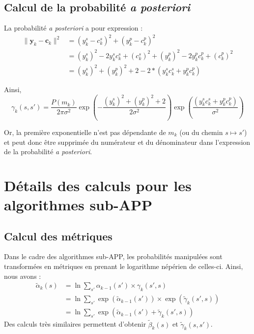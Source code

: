 \subsection{Calcul de la probabilité \textit{a posteriori}}
La probabilité \textit{a posteriori} a pour expression : 
\begin{align*}
	\|\mathbf{y}_k-\mathbf{c}_k\|^2 & = (y_k^s - c_k^s)^2 + (y_k^p - c_k^p)^2                                               \\
	                                & = (y_k^s)^2 - 2  y_k^s   c_k^s +  (c_k^s)^2 + (y_k^p)^2 - 2  y_k^p c_k^p +  (c_k^p)^2 \\
	                                & = (y_k^s)^2 +   (y_k^p)^2 + 2  - 2*( y_k^s   c_k^s +  y_k^p c_k^p)                    
\end{align*}

Ainsi, \[\gamma_k(s,s') = \frac{P(m_k)}{2\pi\sigma^2}\exp\left(-\frac{ (y_k^s)^2 +   (y_k^p)^2 + 2}{2\sigma^2}\right) \exp\left(\frac{( y_k^s   c_k^s +  y_k^p c_k^p)}{\sigma^2}\right)\]

Or, la première exponentielle n'est pas dépendante de $m_k$ (ou du chemin $ s \mapsto s'$) et peut donc être supprimée du numérateur et du dénominateur dans l’expression de la probabilité \textit{a posteriori}.


\section{Détails des calculs pour les algorithmes sub-APP}\label{append:subAPP}
\subsection{Calcul des métriques}
Dans le cadre des algorithmes sub-APP, les probabilités manipulées sont transformées en métriques en prenant le logarithme népérien de celles-ci. Ainsi, nous avons :
\begin{align*}
	\tilde{\alpha}_k(s) & = \ln \sum\limits_{s'}\alpha_{k-1}(s')\times\gamma_k(s',s)                                                     \\
	                    & = \ln \sum\limits_{s'} \exp\left(\tilde{\alpha}_{k-1}(s')\right)\times\exp\left(\tilde{\gamma}_k(s', s)\right) \\
	                    & = \ln \sum\limits_{s'} \exp\left(\tilde{\alpha}_{k-1}(s') + \tilde{\gamma}_k(s', s)\right)                     
\end{align*}
Des calculs très similaires permettent d'obtenir $\tilde{\beta}_k(s)$ et $\tilde{\gamma}_k(s,s')$.

